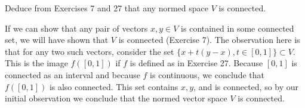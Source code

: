 \begin{exercise}{28}
    Deduce from Exercises 7 and 27 that any normed space $V$ is connected.
\end{exercise}

\begin{solution}
    
    If we can show that any pair of vectors $x, y \in V$ is contained in some connected set, we will have shown that $V$ is connected (Exercise 7).
    The observation here is that for any two such vectors, consider the set $\{x + t(y - x), t \in [0, 1]\} \subset V$.
    This is the image $f([0, 1])$ if $f$ is defined as in Exercise 27.
    Because $[0, 1]$ is connected as an interval and because $f$ is continuous, we conclude that $f([0, 1])$ is also connected.
    This set contains $x, y$, and is connected, so by our initial observation we conclude that the normed vector space $V$ is connected.
\end{solution}